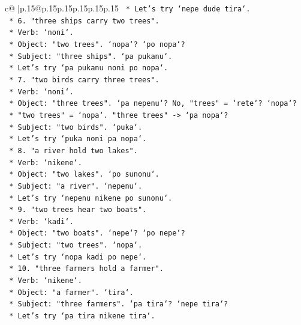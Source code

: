 \documentclass{article}
\begin{document}
{\begin{supertabular}{c@{$\;$}|p{.15\linewidth}@{}p{.15\linewidth}p{.15\linewidth}p{.15\linewidth}p{.15\linewidth}p{.15\linewidth}}
{{{\texttt{        *   Let's try `nepe dude tira`.} \\
\texttt{    *   6. "three ships carry two trees".} \\
\texttt{        *   Verb: `noni`.} \\
\texttt{        *   Object: "two trees". `nopa`? `po nopa`?} \\
\texttt{        *   Subject: "three ships". `pa pukanu`.} \\
\texttt{        *   Let's try `pa pukanu noni po nopa`.} \\
\texttt{    *   7. "two birds carry three trees".} \\
\texttt{        *   Verb: `noni`.} \\
\texttt{        *   Object: "three trees". `pa nepenu`? No, "trees" = `rete`? `nopa`?} \\
\texttt{        *   "two trees" = `nopa`. "three trees" {-}> `pa nopa`?} \\
\texttt{        *   Subject: "two birds". `puka`.} \\
\texttt{        *   Let's try `puka noni pa nopa`.} \\
\texttt{    *   8. "a river hold two lakes".} \\
\texttt{        *   Verb: `nikene`.} \\
\texttt{        *   Object: "two lakes". `po sunonu`.} \\
\texttt{        *   Subject: "a river". `nepenu`.} \\
\texttt{        *   Let's try `nepenu nikene po sunonu`.} \\
\texttt{    *   9. "two trees hear two boats".} \\
\texttt{        *   Verb: `kadi`.} \\
\texttt{        *   Object: "two boats". `nepe`? `po nepe`?} \\
\texttt{        *   Subject: "two trees". `nopa`.} \\
\texttt{        *   Let's try `nopa kadi po nepe`.} \\
\texttt{    *   10. "three farmers hold a farmer".} \\
\texttt{        *   Verb: `nikene`.} \\
\texttt{        *   Object: "a farmer". `tira`.} \\
\texttt{        *   Subject: "three farmers". `pa tira`? `nepe tira`?} \\
\texttt{        *   Let's try `pa tira nikene tira`.} \\
\\ 
}}}
\end{supertabular}}
\end{document}
